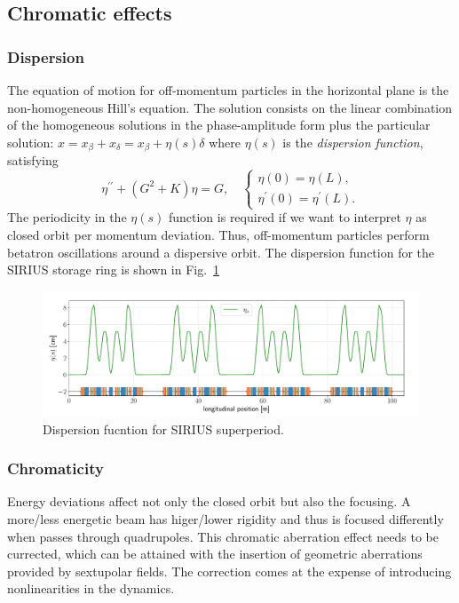 \subsection{Chromatic effects}
\subsubsection{Dispersion}
The equation of motion for off-momentum particles in the horizontal plane is the non-homogeneous Hill's equation. The solution consists on the linear combination of the homogeneous solutions in the phase-amplitude form plus the particular solution: $x=x_\beta+ x_\delta = x_\beta+ \eta(s)\delta $ where $\eta(s)$ is the \textit{dispersion function}, satisfying
    \begin{equation*}
        \eta^{\prime\prime}+(G^2+K)\eta=G,\quad
        \begin{cases}
            \eta(0) = \eta(L),\\
            \eta^\prime(0) = \eta^\prime(L).
        \end{cases}
    \end{equation*}
    The periodicity in the $\eta(s)$ function is required if we want to interpret $\eta$ as closed orbit per momentum deviation. Thus, off-momentum particles perform betatron oscillations around a dispersive orbit. The dispersion function for the SIRIUS storage ring is shown in Fig.~\ref{dispersion_func}
    \begin{figure}[htb]
        \centering
        \includegraphics[width=\textwidth]{Images/dispersion.pdf}
        \caption{Dispersion fucntion for SIRIUS superperiod.}
        \label{dispersion_func}
    \end{figure}
\subsubsection{Chromaticity}
Energy deviations affect not only the closed orbit but also the focusing. A more/less energetic beam has higer/lower rigidity and thus is focused differently when passes through quadrupoles. This chromatic aberration effect needs to be currected, which can be attained with the insertion of geometric aberrations provided by sextupolar fields. The correction comes at the expense of introducing nonlinearities in the dynamics.

